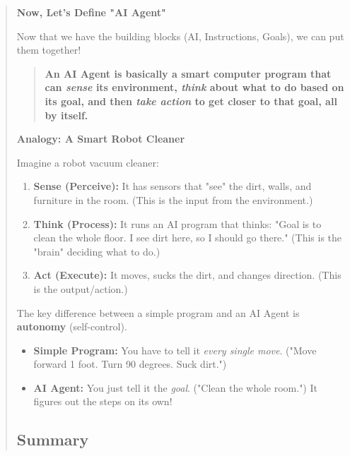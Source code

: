 \begin{quote}
    \textbf{Now, Let's Define "AI Agent"}

    Now that we have the building blocks (AI, Instructions, Goals), we can put them together!

    \begin{quote}
        \textbf{An AI Agent is basically a smart computer program that can \textit{sense} its environment, \textit{think} about what to do based on its goal, and then \textit{take action} to get closer to that goal, all by itself.}
    \end{quote}

    \textbf{Analogy: A Smart Robot Cleaner}

    Imagine a robot vacuum cleaner:

    \begin{enumerate}
        \item \textbf{Sense (Perceive):} It has sensors that "see" the dirt, walls, and furniture in the room. (This is the input from the environment.)
        \item \textbf{Think (Process):} It runs an AI program that thinks: "Goal is to clean the whole floor. I see dirt here, so I should go there." (This is the "brain" deciding what to do.)
        \item \textbf{Act (Execute):} It moves, sucks the dirt, and changes direction. (This is the output/action.)
    \end{enumerate}

    The key difference between a simple program and an AI Agent is \textbf{autonomy} (self-control).

    \begin{itemize}
        \item \textbf{Simple Program:} You have to tell it \textit{every single move}. ("Move forward 1 foot. Turn 90 degrees. Suck dirt.")
        \item \textbf{AI Agent:} You just tell it the \textit{goal}. ("Clean the whole room.") It figures out the steps on its own!
    \end{itemize}

    \subsection*{Summary}


\end{quote}
